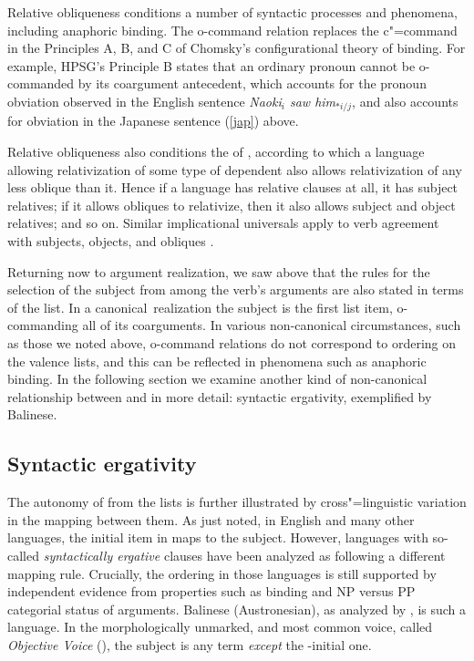 \documentclass[output=paper
                ,modfonts
                ,nonflat
	        ,collection
	        ,collectionchapter
	        ,collectiontoclongg
 	        ,biblatex
                ,babelshorthands
                ,newtxmath
                ,draftmode
                ,colorlinks, citecolor=brown
]{./langsci/langscibook}
\begin{document}
Relative obliqueness conditions a number of syntactic processes and phenomena, including anaphoric binding.  The o-command relation replaces the c"=command in the Principles A, B, and C of Chomsky's \citeyearpar{Chomsky:1981} configurational theory of binding.  For example, HPSG's Principle B states that an ordinary pronoun cannot be o-commanded by its coargument antecedent, which accounts for the pronoun obviation observed in the English sentence \textit{Naoki$_i$ saw him$_{*i/j}$}, and also accounts for obviation in the Japanese sentence (\ref{jap}) above.  

Relative obliqueness also conditions the  of \citet{KeenanandComrie1977}, according to which a language allowing relativization of some type of dependent also allows relativization of any less oblique than it.  Hence if a language has relative clauses at all, it has subject relatives; if it allows obliques to relativize, then it also allows subject and object relatives; and so on.  
Similar implicational universals apply to verb agreement with subjects, objects, and obliques  \citep{greenberg:1966}.  

Returning now to argument realization, we saw above that the rules for the selection of the subject from among the verb's arguments are also stated in terms of the \argst list.  In a canonical\ realization the subject is the first list item, o-commanding all of its coarguments.
In various non-canonical circumstances, such as those we noted above, o-command relations do not correspond to ordering on the valence lists, and this can be reflected in phenomena such as anaphoric binding.
In the following section we examine another kind of non-canonical relationship between \argst and \val in more detail: syntactic ergativity, exemplified by Balinese.

\subsection{Syntactic ergativity}
\label{ergativity}\label{arg-st-sec-ergativity}
The autonomy of \argst from the \val lists is further illustrated by cross"=linguistic variation in the mapping between them.  As just noted, in English and many other languages, the initial item in \argst maps to the subject.  However,  languages with so-called \emph{syntactically ergative} clauses have been analyzed as following a different mapping rule.  Crucially, the \argst ordering in those languages is still supported by independent evidence from properties such as binding and NP versus PP categorial status of arguments.
Balinese (Austronesian), as analyzed by \citet{Wechsler+Arka:1998}, is such a language.  In the morphologically unmarked, and most common voice, called \emph{Objective Voice} (), the subject is any term \textit{except} the \argst-initial one.   
\end{document}
